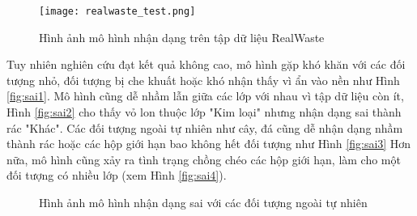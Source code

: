\documentclass[../the.tex]{subfiles}
\begin{document}
\begin{figure}[H]
    \centering
    \texttt{[image: realwaste\_test.png]}
    \caption{Hình ảnh mô hình nhận dạng trên tập dữ liệu RealWaste}
    \label{fig:realwaste}
\end{figure}

{\fontsize{13}{12} \selectfont

Tuy nhiên nghiên cứu đạt kết quả không cao, mô hình gặp khó khăn với các đối tượng nhỏ, đối tượng bị che khuất hoặc khó nhận thấy vì ẩn vào nền như Hình \ref{fig:sai1}.
Mô hình cũng dễ nhầm lẫn giữa các lớp với nhau vì tập dữ liệu còn ít, Hình \ref{fig:sai2} cho thấy vỏ lon thuộc lớp "Kim loại" nhưng nhận dạng sai thành rác "Khác".
Các đối tượng ngoài tự nhiên như cây, đá cũng dễ nhận dạng nhầm thành rác hoặc các hộp giới hạn bao không hết đối tượng như Hình \ref{fig:sai3}
Hơn nữa, mô hình cũng xảy ra tình trạng chồng chéo các hộp giới hạn, làm cho một đối tượng có nhiều lớp (xem Hình \ref{fig:sai4}).

}


\begin{figure}[H]
    \centering
    \qquad
    \qquad
    \qquad
    \caption{Hình ảnh mô hình nhận dạng sai với các đối tượng ngoài tự nhiên}
    \label{fig:sai}
\end{figure}
\end{document}
